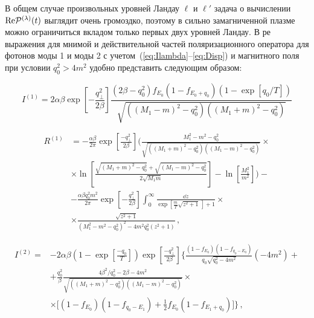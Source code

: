 В общем случае произвольных уровней Ландау $\ell$ и $\ell'$ задача о вычислении $\textrm{Re} {\cal P}^{(\lambda)}(t)$ выглядит очень громоздко, поэтому в сильно замагниченной плазме можно ограничиться вкладом только первых двух уровней Ландау. В ре выражения для мнимой и действительной частей поляризационного оператора для фотонов моды 1 и моды 2 с учетом~(\ref{eq:Ilambda}--\ref{eq:Disp}) и магнитного поля при условии $q_0^2>4m^2$ удобно представить следующим образом:

\begin{equation}
I^{(1)}=2\alpha\beta\exp \left[-\frac{q_\perp^2}{2\beta }\right]\frac{\left(2\beta -q_0^2\right) f_{E_0}\left(1-f_{E_0+q_0}\right)\left(1-\exp[q_0/T]\right)}{ \sqrt{\left((M_1-m)^2-q_0^2\right) \left((M_1+m)^2-q_0^2\right)}}
\end{equation}

\begin{equation}\begin{aligned}
R^{(1)}&= -\frac{\alpha \beta}{2\pi}\exp\left[\frac{-q_\perp^2}{2\beta}\right]\bigg(\frac{M_1^2-m^2-q_0^2}{\sqrt{((M_1+m)^2-q_0^2)((M_1-m)^2-q_0^2)}}
\times
\\
&\times
\ln\left[\frac{\sqrt{(M_1+m)^2-q_0^2}+\sqrt{(M_1-m)^2-q_0^2}}{2\sqrt{M_1 m}}\right]-\ln\left[\frac{M_1^2}{m^2}\right]\bigg)
-
\\
&-\frac{\alpha \beta q_0^2 m^2}{2\pi} \exp\left[-\frac{q_\perp^2}{2\beta}\right]\int_{0}^{\infty}\frac{\dd z}{\exp \left[\frac{m}{T}\sqrt{z^2+1}\,\right]+1}\times
\\
&\times\frac{\sqrt{z^2+1}}{ \left(M_1^2-m^2-q_0^2\right)^2-4m^2q_0^2 \left(z^2+1\right)}\, ,
\end{aligned}
\end{equation}

\begin{equation}\begin{aligned}
I^{(2)}=&-2\alpha\beta\left(1-\exp\left[{\frac{-q_0}{T}}\right]\right)\exp\left[{\frac{-q^2_\perp}{2\beta}}\right] \bigg\{
\frac{(1-f_{E_{0}}) (1 - f_{q_0 - E_{0}})}{q_0\sqrt{q^{2}_{0}-4 m^2}}
\left (- 4 m^2 \right )+
\\
& 
+
\frac{q_0^2}{\beta}
\frac{4\beta^2/q^{2}_{0} - 2 \beta - 4 m^2}{\sqrt{((M_1+m)^2-q_0^2)((M_1-m)^2-q_0^2)}}\times
\\
&\times\bigg[(1-f_{E_{0}}) (1 - f_{q_0 - E_{1}})+
\frac{1}{2}f_{E_{0}} (1 - f_{E_{1} + q_0})
\bigg]
\bigg\}\, ,
\end{aligned}\end{equation}

